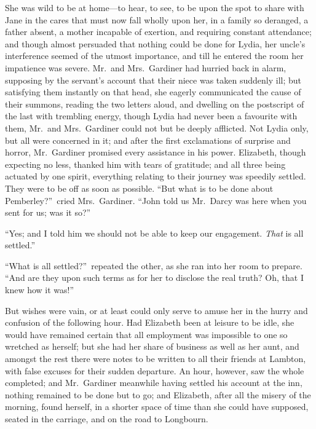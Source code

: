 \documentclass[12pt,english,oneside]{book}
\begin{document}
She was wild to be at home\mbox{---}to hear, to see, to be upon the
spot to share with Jane in the cares that must now fall wholly upon
her, in a family so deranged, a father absent, a mother incapable
of exertion, and requiring constant attendance; and though almost
persuaded that nothing could be done for Lydia, her uncle's interference
seemed of the utmost importance, and till he entered the room her
impatience was severe. Mr.\ and Mrs.\ Gardiner had hurried back
in alarm, supposing by the servant's account that their niece was
taken suddenly ill; but satisfying them instantly on that head, she
eagerly communicated the cause of their summons, reading the two letters
aloud, and dwelling on the postscript of the last with trembling energy,
though Lydia had never been a favourite with them, Mr.\ and Mrs.\ Gardiner
could not but be deeply afflicted. Not Lydia only, but all were concerned
in it; and after the first exclamations of surprise and horror, Mr.\ Gardiner
promised every assistance in his power. Elizabeth, though expecting
no less, thanked him with tears of gratitude; and all three being
actuated by one spirit, everything relating to their journey was speedily
settled. They were to be off as soon as possible. {}``But what is
to be done about Pemberley?''\ cried Mrs.\ Gardiner. {}``John
told us Mr.\ Darcy was here when you sent for us; was it so?''\ 

{}``Yes; and I told him we should not be able to keep our engagement.
\textit{That} is all settled.''

{}``What is all settled?''\ repeated the other, as she ran into
her room to prepare. {}``And are they upon such terms as for her
to disclose the real truth? Oh, that I knew how it was!''\ 

But wishes were vain, or at least could only serve to amuse her in
the hurry and confusion of the following hour. Had Elizabeth been
at leisure to be idle, she would have remained certain that all employment
was impossible to one so wretched as herself; but she had her share
of business as well as her aunt, and amongst the rest there were notes
to be written to all their friends at Lambton, with false excuses
for their sudden departure. An hour, however, saw the whole completed;
and Mr.\ Gardiner meanwhile having settled his account at the inn,
nothing remained to be done but to go; and Elizabeth, after all the
misery of the morning, found herself, in a shorter space of time than
she could have supposed, seated in the carriage, and on the road to
Longbourn.
\end{document}
